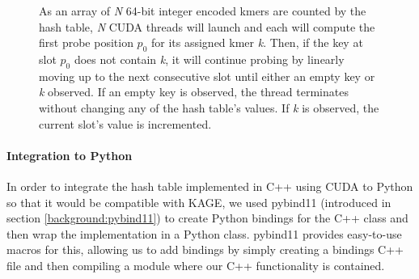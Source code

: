 \begin{figure}[H]
\begin{center}
{
}
\caption{
  As an array of \textit{N} 64-bit integer encoded kmers are counted by the hash table, \textit{N} CUDA threads will launch and each will compute the first probe position $p_0$ for its assigned kmer \textit{k}. Then, if the key at slot $p_0$ does not contain \textit{k}, it will continue probing by linearly moving up to the next consecutive slot until either an empty key or \textit{k} observed. If an empty key is observed, the thread terminates without changing any of the hash table's values. If \textit{k} is observed, the current slot's value is incremented.
}
\label{methods:gpu_accelerating_kmer_counting:figures:count_example}
\end{center}
\end{figure}

\paragraph{Integration to Python}
In order to integrate the hash table implemented in C++ using CUDA to Python so that it would be compatible with KAGE, we used pybind11 (introduced in section \ref{background:pybind11}) to create Python bindings for the C++ class and then wrap the implementation in a Python class.
pybind11 provides easy-to-use macros for this, allowing us to add bindings by simply creating a bindings C++ file and then compiling a module where our C++ functionality is contained.


